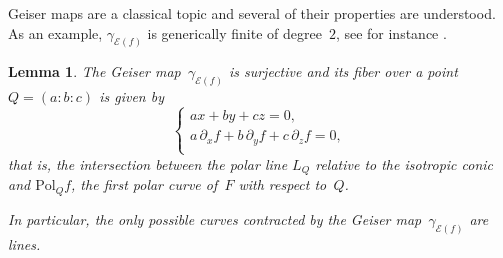 \documentclass{amsart}
\theoremstyle{plain}
\newtheorem{lemma}{Lemma}[section]
\theoremstyle{definition}
\newcommand{\Eig}[1]{\mathcal{E}\!\left( {#1} \right)}
\begin{document}
Geiser maps are a classical topic and several of their properties are understood. As an example, $\gamma_{\Eig{f}}$ is generically finite of degree~$2$, see for instance \cite[Section~8.7.2]{Dolgachev}.

\begin{lemma}
The Geiser map~$\gamma_{\Eig{f}}$ is surjective and its fiber over a point $Q = (a:b:c)$ is given by
%
\begin{equation}
\label{eq:fibers}
    \left\{
    \begin{array}{l}
    a x + by + cz = 0, \\[2pt]
    a \, \partial_x f + b \, \partial_y f + c \, \partial_z f = 0,\\
 \end{array}\right.
\end{equation}
%
that is, the intersection between the polar line $L_Q$ relative to the isotropic conic and $\mathrm{Pol}_Q f$, the
first polar curve of~$F$ with respect to~$Q$.

In particular, the only possible curves contracted by the Geiser map~$\gamma_{\Eig{f}}$ are lines.
\end{lemma}
\end{document}
